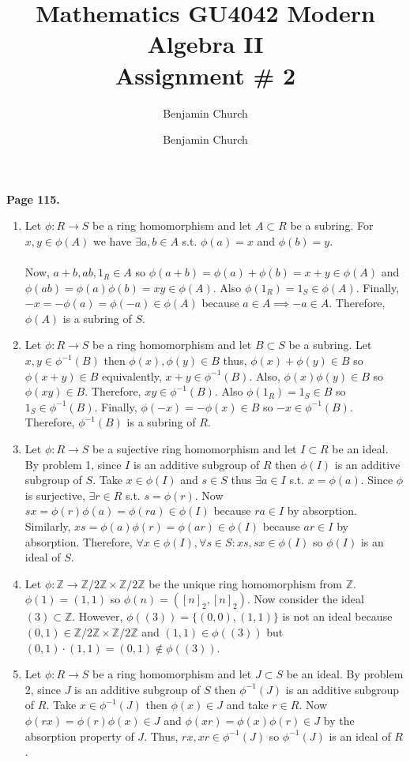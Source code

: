 \documentclass[12pt]{extarticle}
\author{Benjamin Church }
\newcommand{\Z}{\mathbb{Z}}
\newcommand{\invI}[2]{#1^{-1} \left( #2 \right)}
\newcommand{\atitle}[1]{\title{%
	\large \textbf{Mathematics GU4042 Modern Algebra II
	\\ Assignment \# #1} \vspace{-2ex}}
\author{Benjamin Church }
\maketitle}
\begin{document}
\atitle{2}
\textbf{Page 115.} 
\begin{enumerate}
\item Let $\phi : R \rightarrow S$ be a ring homomorphism and let $A \subset R$ be a subring. For $x, y \in \phi(A)$ we have $\exists a,b \in A$ s.t. $\phi(a) = x$ and $\phi(b) = y$. \\ \\ Now, $a + b, ab, 1_R \in A$ so $\phi(a+b) = \phi(a) + \phi(b) = x + y \in \phi(A)$ and $\phi(ab) = \phi(a) \phi(b) = xy \in  \phi(A)$. Also $\phi(1_R) = 1_S \in \phi(A)$. Finally, $-x = -\phi(a) = \phi(-a) \in \phi(A)$ because $a \in A \implies -a \in A$. Therefore, $\phi(A)$ is a subring of $S$.

\item Let $\phi : R \rightarrow S$ be a ring homomorphism and let $B \subset S$ be a subring. Let $x, y \in \invI{\phi}{B}$ then $\phi(x), \phi(y) \in B$ thus, $\phi(x) + \phi(y) \in B$ so $\phi(x+y) \in B$ equivalently, $x+y \in \invI{\phi}{B}$. Also, $\phi(x)\phi(y) \in B$ so $\phi(xy) \in B$. Therefore, $xy \in \invI{\phi}{B}$. Also $\phi(1_R) = 1_S \in B$ so $1_S \in \invI{\phi}{B}$. Finally, $\phi(-x) = - \phi(x) \in B$ so $-x \in \invI{\phi}{B}$. Therefore, $\invI{\phi}{B}$ is a subring of $R$.

\item Let $\phi : R \rightarrow S$ be a sujective ring homomorphism and let $I \subset R$ be an ideal. By problem 1, since $I$ is an additive subgroup of $R$ then $\phi(I)$ is an additive subgroup of $S$. Take $x \in \phi(I)$ and $s \in S$ thus $\exists a \in I$ s.t. $x = \phi(a)$. Since $\phi$ is surjective, $\exists r \in R$ s.t. $s = \phi(r)$. Now $sx = \phi(r) \phi(a) = \phi(ra) \in \phi(I)$ because $ra \in I$ by absorption. Similarly, $xs = \phi(a) \phi(r) = \phi(ar) \in \phi(I)$ because $ar \in I$ by absorption. Therefore, $\forall x \in \phi(I), \forall s \in S : xs, sx \in \phi(I)$ so $\phi(I)$ is an ideal of $S$. 

\item Let $\phi : \Z \rightarrow \Z/ 2\Z \times \Z/2\Z$ be the unique ring homomorphism from $\Z$. $\phi(1) = (1,1)$ so $\phi(n) = ([n]_2, [n]_2)$. Now consider the ideal $(3) \subset \Z$. However, $\phi((3)) = \{(0, 0), (1, 1) \}$ is not an ideal because $(0, 1) \in \Z/ 2\Z \times \Z/2\Z$ and $(1, 1) \in \phi((3))$ but $(0, 1) \cdot (1, 1) = (0, 1) \notin \phi((3))$.

\item Let $\phi : R \rightarrow S$ be a ring homomorphism and let $J \subset S$ be an ideal. By problem 2, since $J$ is an additive subgroup of $S$ then $\invI{\phi}{J}$ is an additive subgroup of $R$. Take $x \in \invI{\phi}{J}$ then $\phi(x) \in J$ and take $r \in R$. Now $\phi(rx) = \phi(r) \phi(x) \in J$ and $\phi(xr) = \phi(x) \phi(r) \in J$ by the absorption property of $J$. Thus, $rx, xr \in \invI{\phi}{J}$ so $\invI{\phi}{J}$ is an ideal of $R$.


\end{enumerate}
\end{document}
